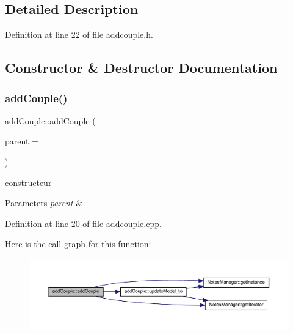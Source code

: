 \subsection{Detailed Description}


Definition at line 22 of file addcouple.\+h.



\subsection{Constructor \& Destructor Documentation}
\mbox{\label{classadd_couple_a5c478c6e07cd0b9639c4c84687c89764}} 
\subsubsection{\texorpdfstring{add\+Couple()}{addCouple()}}
{\footnotesize\ttfamily add\+Couple\+::add\+Couple (\begin{DoxyParamCaption}\item[{Q\+Widget $\ast$}]{parent = {} }\end{DoxyParamCaption})\hspace{0.3cm}{\ttfamily [explicit]}}



constructeur 


\begin{DoxyParams}{Parameters}
{\em parent} & \\
\hline
\end{DoxyParams}


Definition at line 20 of file addcouple.\+cpp.

Here is the call graph for this function\+:\nopagebreak
\begin{figure}[H]
\begin{center}
\leavevmode
\includegraphics[width=350pt]{classadd_couple_a5c478c6e07cd0b9639c4c84687c89764_cgraph}
\end{center}
\end{figure}


